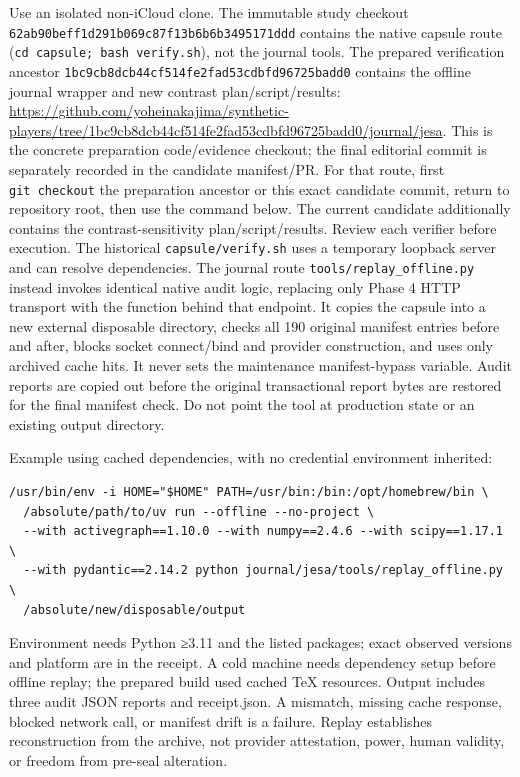 \documentclass[11pt]{article}
\begin{document}
Use an isolated non-iCloud clone. The immutable study checkout
\nolinkurl{62ab90beff1d291b069c87f13b6b6b3495171ddd} contains the native
capsule route (\texttt{cd\ capsule;\ bash\ verify.sh}), not the journal
tools. The prepared verification ancestor
\nolinkurl{1bc9cb8dcb44cf514fe2fad53cdbfd96725badd0} contains the
offline journal wrapper and new contrast plan/script/results:
\url{https://github.com/yoheinakajima/synthetic-players/tree/1bc9cb8dcb44cf514fe2fad53cdbfd96725badd0/journal/jesa}.
This is the concrete preparation code/evidence checkout; the final
editorial commit is separately recorded in the candidate manifest/PR.
For that route, first \texttt{git\ checkout} the preparation ancestor or
this exact candidate commit, return to repository root, then use the
command below. The current candidate additionally contains the
contrast-sensitivity plan/script/results. Review each verifier before
execution. The historical \texttt{capsule/verify.sh} uses a temporary
loopback server and can resolve dependencies. The journal route
\texttt{tools/replay\_offline.py} instead invokes identical native audit
logic, replacing only Phase 4 HTTP transport with the function behind
that endpoint. It copies the capsule into a new external disposable
directory, checks all 190 original manifest entries before and after,
blocks socket connect/bind and provider construction, and uses only
archived cache hits. It never sets the maintenance manifest-bypass
variable. Audit reports are copied out before the original transactional
report bytes are restored for the final manifest check. Do not point the
tool at production state or an existing output directory.

Example using cached dependencies, with no credential environment
inherited:

\begin{verbatim}
/usr/bin/env -i HOME="$HOME" PATH=/usr/bin:/bin:/opt/homebrew/bin \
  /absolute/path/to/uv run --offline --no-project \
  --with activegraph==1.10.0 --with numpy==2.4.6 --with scipy==1.17.1 \
  --with pydantic==2.14.2 python journal/jesa/tools/replay_offline.py \
  /absolute/new/disposable/output
\end{verbatim}

Environment needs Python ≥3.11 and the listed packages; exact observed
versions and platform are in the receipt. A cold machine needs
dependency setup before offline replay; the prepared build used cached
TeX resources. Output includes three audit JSON reports and
receipt.json. A mismatch, missing cache response, blocked network call,
or manifest drift is a failure. Replay establishes reconstruction from
the archive, not provider attestation, power, human validity, or freedom
from pre-seal alteration.
\end{document}
